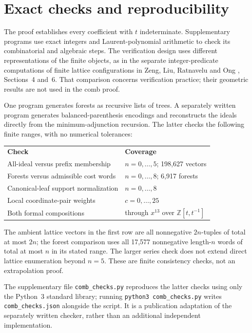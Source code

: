 \documentclass[11pt]{article}
\newcommand{\Z}{\mathbb{Z}}
\begin{document}
\section{Exact checks and reproducibility}

The proof establishes every coefficient with $t$ indeterminate.
Supplementary programs use exact integers and Laurent-polynomial arithmetic
to check its combinatorial and algebraic steps. The verification design
uses different representations of the finite objects, as in the separate
integer-predicate computations of finite lattice configurations in
Zeng, Liu, Ratnavelu and Ong \cite{ZengChecks}, Sections~4 and~6.
That comparison concerns verification practice; their geometric results
are not used in the comb proof.

One program generates forests as recursive lists of trees. A separately
written program generates balanced-parenthesis encodings and reconstructs
the ideals directly from the minimum-adjunction recursion. The latter
checks the following finite ranges, with no numerical tolerances:
\begin{center}
\begin{tabular}{@{}ll@{}}

\textbf{Check} & \textbf{Coverage}\\

All-ideal versus prefix membership & $n=0,\ldots,5$; 198,627 vectors\\
Forests versus admissible cost words & $n=0,\ldots,8$; 6,917 forests\\
Canonical-leaf support normalization & $n=0,\ldots,8$\\
Local coordinate-pair weights & $c=0,\ldots,25$\\
Both formal compositions & through $x^{13}$ over $\Z[t,t^{-1}]$\\

\end{tabular}
\end{center}
The ambient lattice vectors in the first row are all nonnegative
$2n$-tuples of total at most $2n$; the forest comparison uses all 17,577
nonnegative length-$n$ words of total at most $n$ in its stated range.
The larger series check does not extend direct lattice enumeration beyond
$n=5$. These are finite consistency checks, not an extrapolation proof.

The supplementary file \texttt{comb\_checks.py} reproduces the latter
checks using only the Python~3 standard library; running
\texttt{python3 comb\_checks.py} writes \texttt{comb\_checks.json} alongside
the script. It is a publication adaptation of the separately written
checker, rather than an additional independent implementation.
\end{document}
